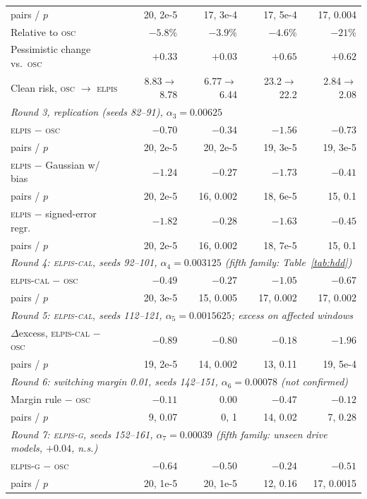 \documentclass{esannV2}
\newcommand{\OSC}{\textsc{osc}}
\newcommand{\RPT}{\textsc{elpis}}
\newcommand{\AUTO}{\textsc{elpis-cal}}
\newcommand{\AUTOD}{\textsc{elpis-g}}
\begin{document}
\begin{table}[!htbp]
{\begin{tabular}{lrrrr}
\quad pairs / $p$ & 20, 2e-5 & 17, 3e-4 & 17, 5e-4 & 17, 0.004\\
Relative to \OSC & $-5.8\%$ & $-3.9\%$ & $-4.6\%$ & $-21\%$\\
Pessimistic change vs.\ \OSC & $+0.33$ & $+0.03$ & $+0.65$ & $+0.62$\\
Clean risk, \OSC{} $\to$ \RPT & 8.83$\to$8.78 & 6.77$\to$6.44 & 23.2$\to$22.2 & 2.84$\to$2.08\\
\midrule
\multicolumn{5}{l}{\emph{Round 3, replication (seeds 82--91), $\alpha_3=0.00625$}}\\
\RPT{} $-$ \OSC & $-0.70$ & $-0.34$ & $-1.56$ & $-0.73$\\
\quad pairs / $p$ & 20, 2e-5 & 20, 2e-5 & 19, 3e-5 & 19, 3e-5\\
\RPT{} $-$ Gaussian w/ bias~\cite{nix1994estimating} & $-1.24$ & $-0.27$ & $-1.73$ & $-0.41$\\
\quad pairs / $p$ & 20, 2e-5 & 16, 0.002 & 18, 6e-5 & 15, 0.1\\
\RPT{} $-$ signed-error regr.~\cite{yoo2019learning} & $-1.82$ & $-0.28$ & $-1.63$ & $-0.45$\\
\quad pairs / $p$ & 20, 2e-5 & 16, 0.002 & 18, 7e-5 & 15, 0.1\\
\midrule
\multicolumn{5}{l}{\emph{Round 4: \AUTO, seeds 92--101, $\alpha_4=0.003125$ (fifth family: Table~\ref{tab:hdd})}}\\
\AUTO{} $-$ \OSC & $-0.49$ & $-0.27$ & $-1.05$ & $-0.67$\\
\quad pairs / $p$ & 20, 3e-5 & 15, 0.005 & 17, 0.002 & 17, 0.002\\
\midrule
\multicolumn{5}{l}{\emph{Round 5: \AUTO, seeds 112--121, $\alpha_5=0.0015625$; excess on affected windows}}\\
$\Delta$excess, \AUTO{} $-$ \OSC & $-0.89$ & $-0.80$ & $-0.18$ & $-1.96$\\
\quad pairs / $p$ & 19, 2e-5 & 14, 0.002 & 13, 0.11 & 19, 5e-4\\
\midrule
\multicolumn{5}{l}{\emph{Round 6: switching margin 0.01, seeds 142--151, $\alpha_6=0.00078$ (not confirmed)}}\\
Margin rule $-$ \OSC & $-0.11$ & $0.00$ & $-0.47$ & $-0.12$\\
\quad pairs / $p$ & 9, 0.07 & 0, 1 & 14, 0.02 & 7, 0.28\\
\midrule
\multicolumn{5}{l}{\emph{Round 7: \AUTOD, seeds 152--161, $\alpha_7=0.00039$ (fifth family: unseen drive models, $+0.04$, n.s.)}}\\
\AUTOD{} $-$ \OSC & $-0.64$ & $-0.50$ & $-0.24$ & $-0.51$\\
\quad pairs / $p$ & 20, 1e-5 & 20, 1e-5 & 12, 0.16 & 17, 0.0015\\
\bottomrule
\end{tabular}}
\end{table}
\end{document}
